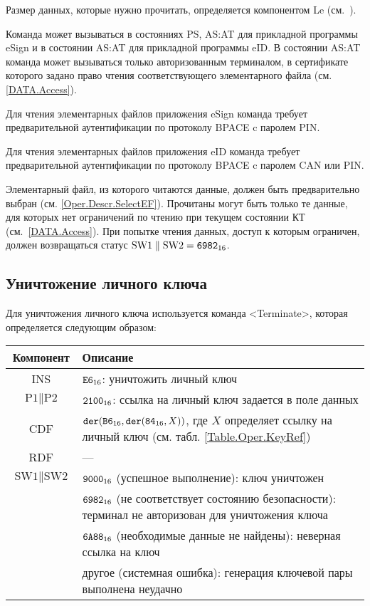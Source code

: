 Размер данных, которые нужно прочитать, определяется компонентом 
Le (см.~\cite{APDU}).

Команда может вызываться в состояниях PS, AS:AT 
для прикладной программы eSign и в состоянии 
AS:AT для прикладной программы eID.
В состоянии AS:AT команда может вызываться только 
авторизованным терминалом, в сертификате которого
задано право чтения соответствующего 
элементарного файла (см. \ref{DATA.Access}).

Для чтения элементарных файлов приложения eSign команда требует 
предварительной аутентификации по протоколу BPACE c 
паролем PIN.

Для чтения элементарных файлов приложения eID команда требует 
предварительной аутентификации по протоколу BPACE c 
паролем CAN или PIN.

Элементарный файл, из которого читаются данные, должен быть предварительно 
выбран (см. \ref{Oper.Descr.SelectEF}). Прочитаны могут быть только те данные, 
для которых нет ограничений по чтению при текущем состоянии КТ (см.~\ref{DATA.Access}). 
При попытке чтения данных, доступ к которым ограничен, должен возвращаться 
статус $\text{SW1} \parallel \text{SW2} = \texttt{6982}_{16}$.



\subsection{Уничтожение личного ключа}
\label{Oper.Descr.Terminate}

Для уничтожения личного ключа используется команда <Terminate>,
которая определяется следующим образом:

\noindent
\begin{tabular}{|c|p{14cm}|}
\hline
Компонент & Описание\\
\hline
\hline
INS & $\texttt{E6}_{16}$: уничтожить личный ключ \\
\hline
$\text{P1} \parallel\text{P2}$ & $\texttt{2100}_{16}$:
ссылка на личный ключ задается в поле данных\\
\hline
CDF &  $\texttt{der}(\texttt{B6}_{16},\texttt{der}(\texttt{84}_{16}, X))$,
где $X$ определяет ссылку на личный ключ
(см. табл. \ref{Table.Oper.KeyRef})\\ 
\hline \hline
RDF & ---  \\
\hline
$\text{SW1} \parallel \text{SW2}$ & 
$\texttt{9000}_{16}$ (успешное выполнение): ключ уничтожен\\
 & $\texttt{6982}_{16}$ (не соответствует состоянию безопасности): терминал не 
авторизован для уничтожения ключа\\
 & $\texttt{6A88}_{16}$ (необходимые данные не найдены): неверная ссылка на ключ\\
 & другое (системная ошибка): генерация ключевой пары выполнена
неудачно\\
\hline
\end{tabular}

